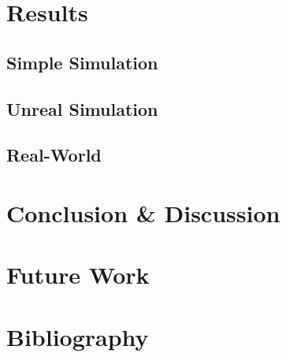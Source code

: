 \documentclass[11pt]{article}
\begin{document}
\section{Results}
\subsection{Simple Simulation}

\subsection{Unreal Simulation}

\subsection{Real-World}



\section{Conclusion \& Discussion}



\section{Future Work}



\section*{Bibliography}
\end{document}

